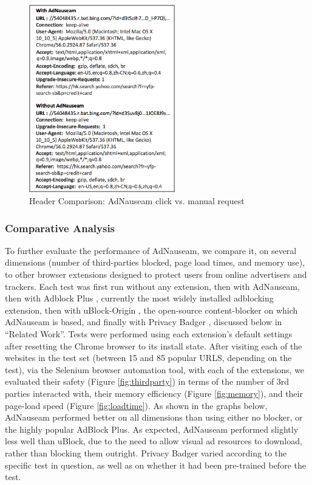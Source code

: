 \documentclass[conference]{IEEEtran}
\begin{document}
\begin{figure}[!t]
\centering
\includegraphics[width=2.5in]{images/headers.png}
\caption{Header Comparison: AdNauseam click vs. manual request}
\label{fig:headers}
\end{figure}

\subsubsection{Comparative Analysis}

To further evaluate the performance of AdNauseam, we compare it, on several dimensions (number of third-parties blocked, page load times, and memory use), to other browser extensions designed to protect users from online advertisers and trackers. Each test was first run without any extension, then with AdNauseam, then with Adblock Plus \cite{AdBlock}, currently the most widely installed adblocking extension, then with uBlock-Origin \cite{Gorhill}, the open-source content-blocker on which AdNauseam is based, and finally with Privacy Badger \cite{EFF-0}, discussed below in “Related Work”. Tests were performed using each extension's default settings after resetting the Chrome browser to its install state. After visiting each of the websites in the test set (between 15 and 85 popular URLS, depending on the test), via the Selenium browser automation tool, with each of the extensions, we evaluated their safety (Figure \ref{fig:thirdparty}) in terms of the number of 3rd parties interacted with, their memory efficiency (Figure \ref{fig:memory}), and their page-load speed (Figure \ref{fig:loadtime}). As shown in the graphs below, AdNauseam performed better on all dimensions than using either no blocker, or the highly popular AdBlock Plus. As expected, AdNauseam performed slightly less well than uBlock, due to the need to allow visual ad resources to download, rather than blocking them outright. Privacy Badger varied according to the specific test in question, as well as on whether it had been pre-trained before the test.
\end{document}

